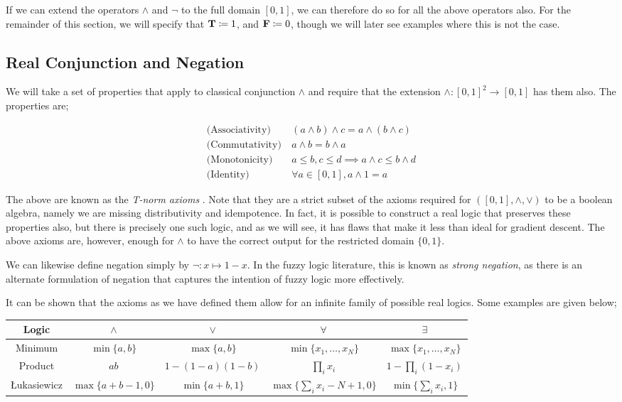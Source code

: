 If we can extend the operators $\land$ and $\neg$ to the full domain $[0,1]$, we can therefore do so for all the above operators also. For the remainder of this section, we will specify that $\textbf{T} \coloneqq 1$, and $\textbf{F} \coloneqq 0$, though we will later see examples where this is not the case.

\subsection{Real Conjunction and Negation}

We will take a set of properties that apply to classical conjunction $\land$ and require that the extension $\land : [0,1]^2 \to [0,1]$ has them also. The properties are;

$$
\begin{aligned}
\text{(Associativity)}&\ (a \land b) \land c = a \land (b \land c) \\
\text{(Commutativity)}&\ a \land b = b \land a \\
\text{(Monotonicity)}&\ a \leq b, c \leq d \implies a \land c \leq b \land d \\
\text{(Identity)}&\ \forall a \in [0,1], a \land 1 = a
\end{aligned}
$$

The above are known as the \textit{T-norm axioms} \cite{tnorms}. Note that they are a strict subset of the axioms required for $([0,1], \land, \lor)$ to be a boolean algebra, namely we are missing distributivity and idempotence. In fact, it is possible to construct a real logic that preserves these properties also, but there is precisely one such logic, and as we will see, it has flaws that make it less than ideal for gradient descent. The above axioms are, however, enough for $\land$ to have the correct output for the restricted domain $\{0,1\}$. 

We can likewise define negation simply by $\lnot : x \mapsto 1 - x$. In the fuzzy logic literature, this is known as \textit{strong negation}, as there is an alternate formulation of negation that captures the intention of fuzzy logic more effectively.

It can be shown that the axioms as we have defined them allow for an infinite family of possible real logics. Some examples are given below;

\begin{center}
\begin{tabular}{ c | c c c c }
    Logic & $\land$ & $\lor$ & $\forall$ & $\exists$ \\    
    \hline
    Minimum 
    & $\min\{a,b\}$ 
    & $\max\{a,b\}$ 
    & $\min\{ x_1, \dots, x_N \}$ 
    & $\max\{ x_1, \dots, x_N \}$ \\ 
    Product 
    & $ab$
    & $1 - (1 - a)(1 - b)$
    & $\prod_ix_i$
    & $1 - \prod_{i}(1-x_i)$ \\
    Łukasiewicz
    & $\max\{a+b-1, 0\}$ 
    & $\min\{a+b, 1\}$ 
    & $\max\{\sum_ix_i - N + 1, 0\}$ 
    & $\min\{\sum_ix_i, 1\}$ \\
\end{tabular}
\end{center}

